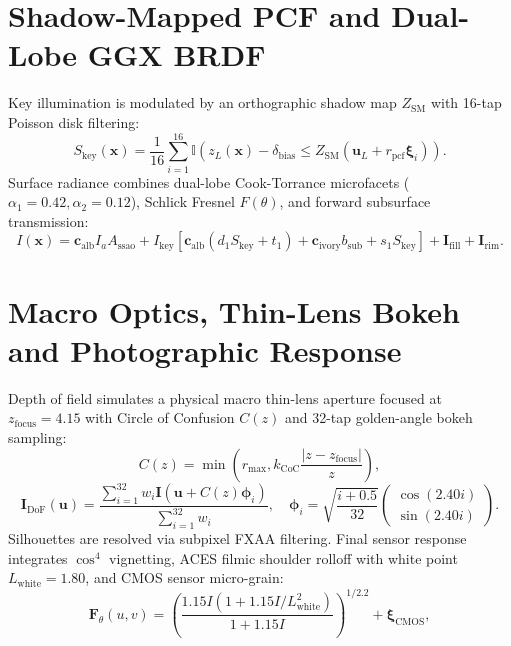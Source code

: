 \documentclass[10pt,twocolumn]{article}
\begin{document}
\section{Shadow-Mapped PCF and Dual-Lobe GGX BRDF}
Key illumination is modulated by an orthographic shadow map $Z_{\mathrm{SM}}$ with 16-tap Poisson disk filtering:
\begin{equation}
S_{\mathrm{key}}(\mathbf{x}) = \frac{1}{16} \sum_{i=1}^{16} \mathbb{I}\left( z_L(\mathbf{x}) - \delta_{\mathrm{bias}} \le Z_{\mathrm{SM}}(\mathbf{u}_L + r_{\mathrm{pcf}} \boldsymbol{\xi}_i) \right).
\end{equation}
Surface radiance combines dual-lobe Cook-Torrance microfacets ($\alpha_1 = 0.42, \alpha_2 = 0.12$), Schlick Fresnel $F(\theta)$, and forward subsurface transmission:
\begin{equation}
I(\mathbf{x}) = \mathbf{c}_{\mathrm{alb}} I_a A_{\mathrm{ssao}} + I_{\mathrm{key}} \left[ \mathbf{c}_{\mathrm{alb}}(d_1 S_{\mathrm{key}} + t_1) + \mathbf{c}_{\mathrm{ivory}} b_{\mathrm{sub}} + s_1 S_{\mathrm{key}} \right] + \mathbf{I}_{\mathrm{fill}} + \mathbf{I}_{\mathrm{rim}}.
\end{equation}

\section{Macro Optics, Thin-Lens Bokeh and Photographic Response}
Depth of field simulates a physical macro thin-lens aperture focused at $z_{\mathrm{focus}} = 4.15$ with Circle of Confusion $C(z)$ and 32-tap golden-angle bokeh sampling:
\begin{equation}
C(z) = \min\left( r_{\max}, k_{\mathrm{CoC}} \frac{|z - z_{\mathrm{focus}}|}{z} \right),
\end{equation}
\begin{equation}
\mathbf{I}_{\mathrm{DoF}}(\mathbf{u}) = \frac{\sum_{i=1}^{32} w_i \mathbf{I}(\mathbf{u} + C(z) \boldsymbol{\phi}_i)}{\sum_{i=1}^{32} w_i}, \quad \boldsymbol{\phi}_i = \sqrt{\frac{i + 0.5}{32}}\begin{pmatrix}\cos(2.40 i)\\ \sin(2.40 i)\end{pmatrix}.
\end{equation}
Silhouettes are resolved via subpixel FXAA filtering. Final sensor response integrates $\cos^4$ vignetting, ACES filmic shoulder rolloff with white point $L_{\mathrm{white}} = 1.80$, and CMOS sensor micro-grain:
\begin{equation}
\mathbf{F}_\theta(u, v) = \left( \frac{1.15 I(1 + 1.15 I / L_{\mathrm{white}}^2)}{1 + 1.15 I} \right)^{1 / 2.2} + \boldsymbol{\xi}_{\mathrm{CMOS}},
\end{equation}
\end{document}
